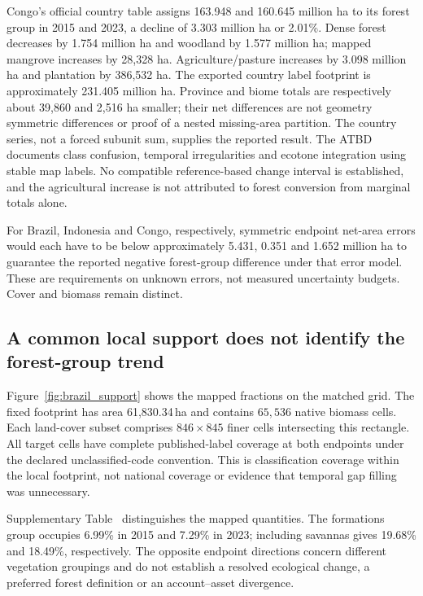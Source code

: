 \documentclass[11pt,a4paper]{article}
\begin{document}
Congo's official country table assigns 163.948 and 160.645 million ha to its forest group in 2015 and 2023, a decline of 3.303 million ha or 2.01\%. Dense forest decreases by 1.754 million ha and woodland by 1.577 million ha; mapped mangrove increases by 28,328 ha. Agriculture/pasture increases by 3.098 million ha and plantation by 386,532 ha. The exported country label footprint is approximately 231.405 million ha. Province and biome totals are respectively about 39,860 and 2,516 ha smaller; their net differences are not geometry symmetric differences or proof of a nested missing-area partition. The country series, not a forced subunit sum, supplies the reported result. The ATBD documents class confusion, temporal irregularities and ecotone integration using stable map labels. No compatible reference-based change interval is established, and the agricultural increase is not attributed to forest conversion from marginal totals alone.

For Brazil, Indonesia and Congo, respectively, symmetric endpoint net-area errors would each have to be below approximately 5.431, 0.351 and 1.652 million ha to guarantee the reported negative forest-group difference under that error model. These are requirements on unknown errors, not measured uncertainty budgets. Cover and biomass remain distinct.

\subsection{A common local support does not identify the forest-group trend}
Figure~\ref{fig:brazil_support} shows the mapped fractions on the matched grid. The fixed footprint has area 61,830.34\,ha and contains $65{,}536$ native biomass cells. Each land-cover subset comprises $846\times845$ finer cells intersecting this rectangle. All target cells have complete published-label coverage at both endpoints under the declared unclassified-code convention. This is classification coverage within the local footprint, not national coverage or evidence that temporal gap filling was unnecessary.

Supplementary Table~ distinguishes the mapped quantities. The formations group occupies 6.99\% in 2015 and 7.29\% in 2023; including savannas gives 19.68\% and 18.49\%, respectively. The opposite endpoint directions concern different vegetation groupings and do not establish a resolved ecological change, a preferred forest definition or an account--asset divergence.
\end{document}
